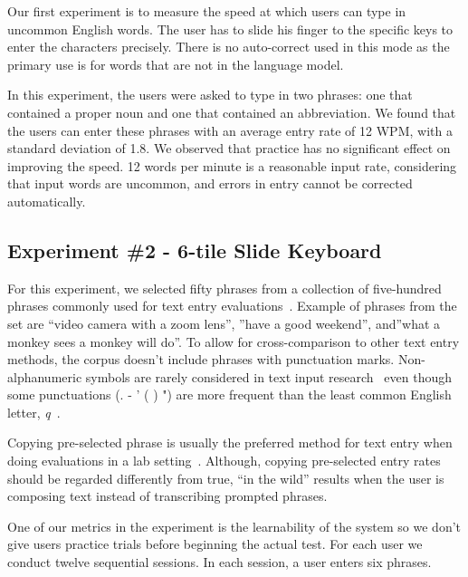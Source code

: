 Our first experiment is to measure the speed at which users can type in uncommon English words.  The user has to slide his finger to the specific keys to enter the characters precisely.  There is no auto-correct used in this mode as the primary use is for words that are not in the language model.  

In this experiment, the users were asked to type in two phrases: one that contained a proper noun and one that contained an abbreviation.  We found that the users can enter these phrases with an average entry rate of 12 WPM, with a standard deviation of 1.8.  We observed that practice has no significant effect on improving the speed. 
12 words per minute is a reasonable input rate, considering that input words are uncommon, and errors in entry cannot be corrected automatically. 


\subsection{Experiment \#2 - 6-tile Slide Keyboard}

For this experiment, we selected fifty phrases from a collection of five-hundred phrases commonly used for text entry evaluations~\cite{mackenzie2003phrase}.
Example of phrases from the set are ``video camera with a zoom lens'', ''have a good weekend'', and''what a monkey sees a monkey will do''.
To allow for cross-comparison to other text entry methods, the corpus doesn't include phrases with punctuation marks.
Non-alphanumeric symbols are rarely considered in text input research~\cite{mackenzie2003phrase} even though some punctuations (. - ' ( ) ") are more frequent than the least common English letter,  \textit{q}~\cite{malikpunctuation}.
 
Copying pre-selected phrase is usually the preferred method for text entry when doing evaluations in a lab setting~\cite{mackenzie2002character, mackenzie2003phrase}.
Although, copying pre-selected entry rates should be regarded differently from true, ``in the wild'' results when the user is composing text instead of transcribing prompted phrases.


One of our metrics in the experiment is the learnability of the system so we don't give users practice trials before beginning the actual test.
For each user we conduct twelve sequential sessions.
In each session, a user enters six phrases.


